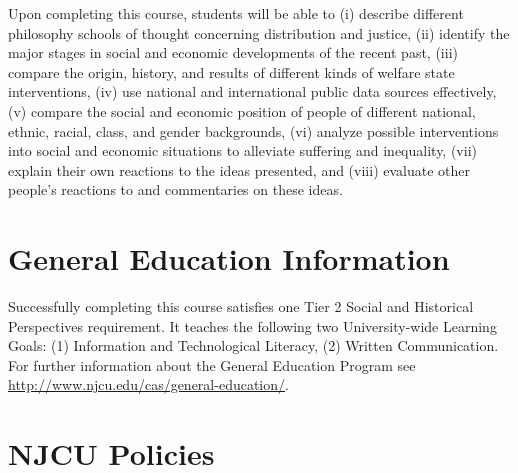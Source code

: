 \documentclass[article,oneside]{memoir}
\begin{document}
Upon completing this course, students will be able to (i) describe different philosophy schools of thought concerning distribution and justice, (ii) identify the major stages in social and economic developments of the recent past, (iii) compare the origin, history, and results of different kinds of welfare state interventions, (iv) use national and international public data sources effectively, (v) compare the social and economic position of people of different national, ethnic, racial, class, and gender backgrounds, (vi) analyze possible interventions into social and economic situations to alleviate suffering and inequality, (vii) explain their own reactions to the ideas presented, and (viii) evaluate other people’s reactions to and commentaries on these ideas.


\section{General Education Information} 
Successfully completing this course satisfies one Tier 2 Social and Historical Perspectives requirement. It teaches the following two University-wide Learning Goals: (1) Information and Technological Literacy, (2) Written Communication. For further information about the General Education Program see \href{http://www.njcu.edu/cas/general-education/}{http://www.njcu.edu/cas/general-education/}.









\section{NJCU Policies}
\end{document}
